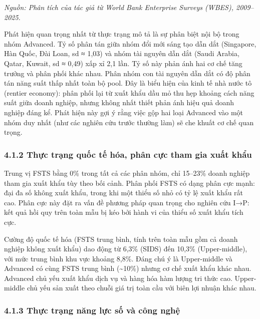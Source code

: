 \documentclass[12pt,a4paper]{article}
\begin{document}
\emph{Nguồn: Phân tích của tác giả từ World Bank Enterprise Surveys
(WBES), 2009--2025.}

Phát hiện quan trọng nhất từ thực trạng mô tả là sự phân biệt nội bộ
trong nhóm Advanced. Tỷ số phân tán giữa nhóm đổi mới sáng tạo dẫn dắt
(Singapore, Hàn Quốc, Đài Loan, sd ≈ 1,03) và nhóm tài nguyên dẫn dắt
(Saudi Arabia, Qatar, Kuwait, sd ≈ 0,49) xấp xỉ 2,1 lần. Tỷ số này phản
ánh hai cơ chế tăng trưởng và phân phối khác nhau. Phân nhóm con tài
nguyên dẫn dắt có độ phân tán năng suất thấp nhất toàn bộ pool. Đây là
biểu hiện của kinh tế nhà nước tô (rentier economy): phân phối lại từ
xuất khẩu dầu mỏ thu hẹp khoảng cách năng suất giữa doanh nghiệp, nhưng
không nhất thiết phản ánh hiệu quả doanh nghiệp đáng kể. Phát hiện này
gợi ý rằng việc gộp hai loại Advanced vào một nhóm duy nhất (như các
nghiên cứu trước thường làm) sẽ che khuất cơ chế quan trọng.

\hypertarget{412-thux1ef1c-trux1ea1ng-quux1ed1c-tux1ebf-huxf3a-phuxe2n-cux1ef1c-tham-gia-xuux1ea5t-khux1ea9u}{%
\subsubsection{4.1.2 Thực trạng quốc tế hóa, phân cực tham gia xuất
khẩu}\label{412-thux1ef1c-trux1ea1ng-quux1ed1c-tux1ebf-huxf3a-phuxe2n-cux1ef1c-tham-gia-xuux1ea5t-khux1ea9u}}

Trung vị FSTS bằng 0\% trong tất cả các phân nhóm, chỉ 15--23\% doanh
nghiệp tham gia xuất khẩu tùy theo bối cảnh. Phân phối FSTS có dạng phân
cực mạnh: đại đa số không xuất khẩu, trong khi một thiểu số nhỏ có tỷ lệ
xuất khẩu rất cao. Phân cực này đặt ra vấn đề phương pháp quan trọng cho
nghiên cứu I→P: kết quả hồi quy trên toàn mẫu bị kéo bởi hành vi của
thiểu số xuất khẩu tích cực.

Cường độ quốc tế hóa (FSTS trung bình, tính trên toàn mẫu gồm cả doanh
nghiệp không xuất khẩu) dao động từ 6,3\% (SIDS) đến 10,3\%
(Upper-middle), với mức trung bình khu vực khoảng 8,8\%. Đáng chú ý là
Upper-middle và Advanced có cùng FSTS trung bình (\textasciitilde10\%)
nhưng cơ chế xuất khẩu khác nhau. Advanced chủ yếu xuất khẩu dịch vụ và
hàng hóa hàm lượng tri thức cao. Upper-middle chủ yếu sản xuất theo
chuỗi giá trị toàn cầu với biên lợi nhuận khác nhau.

\hypertarget{413-thux1ef1c-trux1ea1ng-nux103ng-lux1ef1c-sux1ed1-vuxe0-cuxf4ng-nghux1ec7}{%
\subsubsection{4.1.3 Thực trạng năng lực số và công
nghệ}\label{413-thux1ef1c-trux1ea1ng-nux103ng-lux1ef1c-sux1ed1-vuxe0-cuxf4ng-nghux1ec7}}
\end{document}
